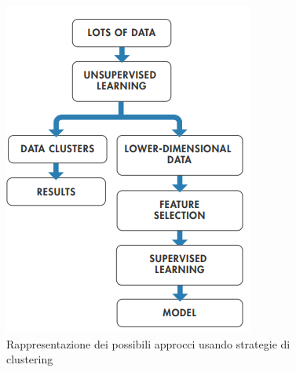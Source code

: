\begin{figure}[]
	\centering
	\includegraphics[scale=0.8]{images/Approcci_Clustering.png}
	\caption{Rappresentazione dei possibili approcci usando strategie di clustering}
\end{figure}
